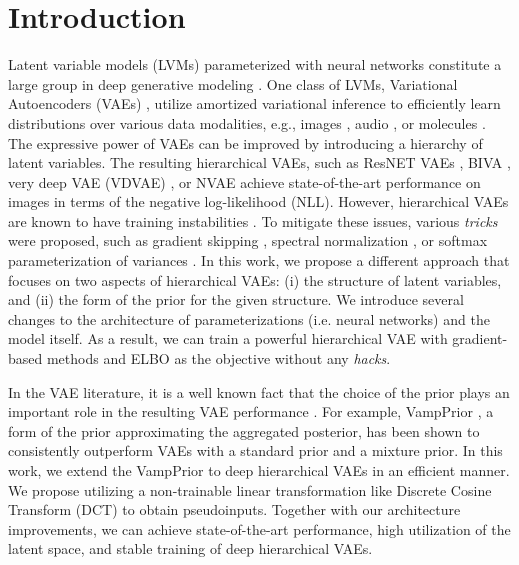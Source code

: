 \section{Introduction}

Latent variable models (LVMs) parameterized with neural networks constitute a large group in deep generative modeling \citep{tomczak2022deep}. One class of LVMs, Variational Autoencoders (VAEs) \citep{kingma2014autoencoding, rezende2014stochastic}, utilize amortized variational inference to efficiently learn distributions over various data modalities, e.g., images \citep{kingma2014autoencoding}, audio \citep{van2017neural}, or molecules \citep{gomez2018automatic}. 
The expressive power of VAEs can be improved by introducing a hierarchy of latent variables. 
The resulting hierarchical VAEs, such as ResNET VAEs \citep{kingma2016improved}, BIVA \citep{maaloe2019biva}, very deep VAE (VDVAE) \citep{Child2020-ze}, or NVAE \citep{vahdat2020nvae} achieve state-of-the-art performance on images in terms of the negative log-likelihood (NLL). However, hierarchical VAEs are known to have training instabilities \citep{vahdat2020nvae}. To mitigate these issues, various \textit{tricks} were proposed, such as gradient skipping \citep{Child2020-ze}, spectral normalization \citep{vahdat2020nvae}, or softmax parameterization of variances \citep{hazami2022efficientvdvae}. In this work, we propose a different approach that focuses on two aspects of hierarchical VAEs: (i) the structure of latent variables, and (ii) the form of the prior for the given structure. We introduce several changes to the architecture of parameterizations (i.e. neural networks) and the model itself. As a result, we can train a powerful hierarchical VAE with gradient-based methods and ELBO as the objective without any \textit{hacks}.

In the VAE literature, it is a well known fact that the choice of the prior plays an important role in the resulting VAE performance \citep{chen2016variational, tomczak2022deep}. For example, VampPrior \citep{tomczak2018vae}, a form of the prior approximating the aggregated posterior, has been shown to consistently outperform VAEs with a standard prior and a mixture prior. 
In this work, we extend the VampPrior to deep hierarchical VAEs in an efficient manner. 
We propose utilizing a non-trainable linear transformation like Discrete Cosine Transform (DCT) to obtain pseudoinputs. Together with our architecture improvements, we can achieve state-of-the-art performance, high utilization of the latent space, and stable training of deep hierarchical VAEs.

